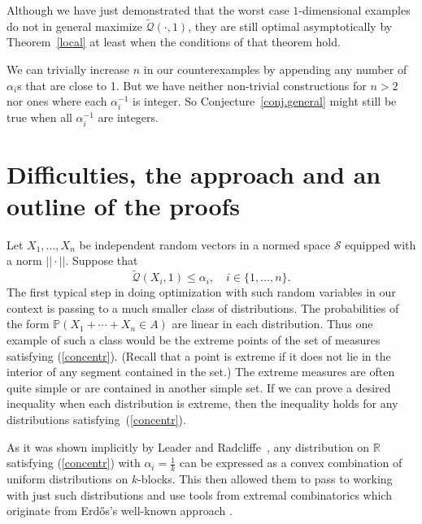\documentclass{article}
\newcommand{\concdiam}{\tilde{\mathcal{Q}}}
\begin{document}
Although we have just demonstrated that the worst case $1$-dimensional examples do not in general maximize $\concdiam(\cdot, 1)$,
they are still optimal asymptotically by Theorem~\ref{local} at least when the conditions of that theorem hold.


We can trivially increase $n$ in our counterexamples by appending any number of $\alpha_i$s that are close to 1. But we have neither non-trivial constructions for $n>2$ nor ones where each $\alpha_i^{-1}$ is integer. So Conjecture~\ref{conj.general} might still be true when all $\alpha_i^{-1}$ are integers. 






\section{Difficulties, the approach and an outline of the proofs}
\label{sec.outline}

Let $X_{1},..., X_{n}$ be independent random vectors in a normed space $\mathcal{S}$ equipped with a norm $||\cdot||$. Suppose that
\begin{equation}\label{concentr}
\concdiam (X_i, 1)\leq \alpha_{i}, \quad i \in \{1, \dots, n\}.
\end{equation}
The first typical step in doing optimization with such random variables in our context is passing to a much smaller class of distributions. The probabilities of the form
$\mathbb{P}(X_1+\cdots+X_n\in A)$ are linear in each distribution. 
Thus one example of such a class would be the
extreme points of the set of measures satisfying (\ref{concentr}).
(Recall that a point is extreme if it
does
not lie in the interior of any segment contained in the set.) The extreme measures are often quite simple or are contained in another simple set. If we can prove a desired inequality 
when each distribution is extreme, then the inequality holds for 
any distributions satisfying~(\ref{concentr}). 



As it was shown implicitly by Leader and Radcliffe~\cite{LR}, any distribution on $\mathbb{R}$ satisfying (\ref{concentr}) with $\alpha_i=\frac{1}{k}$ can be expressed as a convex combination of uniform distributions on  $k$-blocks. This then allowed them to pass to working with just such distributions and use tools from extremal combinatorics 
which originate 
from Erd\H{o}s's well-known approach \cite{ELO}.
\end{document}
